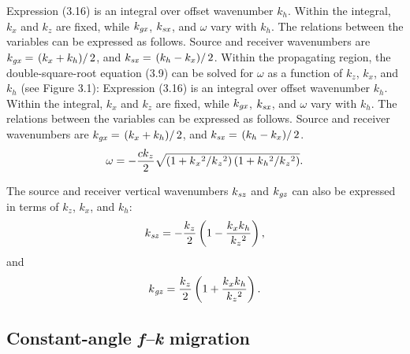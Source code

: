 Expression (3.16) is an integral over offset wavenumber \(k_h\). Within the integral, \(k_x\) and \(k_z\) are fixed, while \(k_{\text{\textit{gx}}}\),
\(k_{\text{\textit{sx}}}\), and $\omega $ vary with \(k_h\). The relations between the variables can be expressed as follows. Source and receiver
wavenumbers are \(k_{\text{\textit{gx}}}=\left.\left(k_x+k_h\right)\right/2\), and \(k_{\text{\textit{sx}}}=\left.\left(k_h-k_x\right)\right/2\).
Within the propagating region, the double-square-root equation (3.9) can be solved for $\omega $ as a function of \(k_z\), \(k_x\), and \(k_h\)
(see Figure 3.1): Expression (3.16) is an integral over offset wavenumber \(k_h\). Within the integral, \(k_x\) and \(k_z\) are fixed, while \(k_{\text{\textit{gx}}}\),
\(k_{\text{\textit{sx}}}\), and $\omega $ vary with \(k_h\). The relations between the variables can be expressed as follows. Source and receiver
wavenumbers are \(k_{\text{\textit{gx}}}=\left.\left(k_x+k_h\right)\right/2\), and \(k_{\text{\textit{sx}}}=\left.\left(k_h-k_x\right)\right/2\).
\begin{equation}\omega = -\frac{\text{\textit{$c$}}\text{\textit{$ $}}\text{\textit{$k$}}_{\text{\textit{$z$}}}}{2}\sqrt{\left(1+\text{\textit{$k$}}_{\text{\textit{$x$}}}{}^2/\text{\textit{$k$}}_z{}^2\right)\left(1+\text{\textit{$k$}}_{\text{\textit{$h$}}}{}^2/\text{\textit{$k$}}_{\text{\textit{$z$}}}{}^2\right)}
.\end{equation}

The source and receiver vertical wavenumbers \(k_{\text{\textit{sz}}}\) and \(k_{\text{\textit{gz}}}\) can also be expressed in terms of \(k_z\),
\(k_x\), and \(k_h\):
\begin{equation}\text{\textit{$k$}}_{\text{\textit{sz}}}=-\frac{\text{\textit{$k$}}_{\text{\textit{$z$}}}}{2} \left(1-\frac{\text{\textit{$k$}}_{\text{\textit{$x$}}}\text{\textit{$k$}}_{\text{\textit{$h$}}}}{\text{\textit{$k$}}_{\text{\textit{$z$}}}{}^2}\right),\end{equation}
and
\begin{equation}\text{\textit{$k$}}_{\text{\textit{gz}}}=\frac{\text{\textit{$k$}}_{\text{\textit{$z$}}}}{2} \left(1+\frac{\text{\textit{$k$}}_{\text{\textit{$x$}}}\text{\textit{$k$}}_{\text{\textit{$h$}}}}{\text{\textit{$k$}}_{\text{\textit{$z$}}}{}^2}\right).\end{equation}

\subsection{Constant-angle \textit{f--k} migration}

